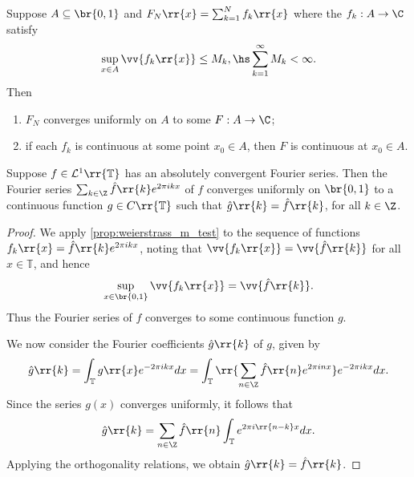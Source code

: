 \documentclass{article}
\begin{document}
\begin{proposition}\label{prop:weierstrass_m_test}
  Suppose $A\subseteq\br{0,1}$ and $F_N\rr{x}=\sum_{k=1}^{ N } f_k\rr{x}$
  where the $f_k:A\to\C$ satisfy
  \begin{align*}
    \sup_{x\in A}\vv{f_k\rr{x}} \leq M_k,\hs \sum_{k=1}^{ \infty } M_k < \infty.
  \end{align*}
  Then
  \begin{enumerate}
    \item $F_N$ converges uniformly on $A$ to some $F:A\to\C$;
    \item if each $f_k$ is continuous at some point $x_0\in A$,
      then $F$ is continuous at $x_0\in A$.
  \end{enumerate}
\end{proposition}

\begin{theorem}
  Suppose $f\in\mathcal L^1\rr{\mathbb T}$ has an absolutely convergent Fourier series. Then the
  Fourier series $\sum_{k\in\Z} \hat f\rr{k}e^{2\pi i k x}$ of $f$ converges uniformly on
  $\br{0,1}$ to a continuous function $g\in C\rr{\mathbb T}$ such that $\hat g\rr{k}=\hat f\rr{k}$,
  for all $k\in\Z$.
  \begin{proof}
    We apply \ref{prop:weierstrass_m_test} to the sequence of functions
    $f_k\rr{x}=\hat f\rr{k}e^{2\pi ikx}$, noting that $\vv{f_k\rr{x}}=\vv{\hat f\rr{k}}$
    for all $x\in\mathbb T$, and hence
    \begin{align*}
      \sup_{x\in\br{0,1}}\vv{f_k\rr{x}}=\vv{\hat f\rr{k}}.
    \end{align*}
    Thus the Fourier series of $f$ converges to some continuous function $g$.

    We now consider the Fourier coefficients $\hat g\rr{k}$ of $g$, given by
    \begin{align*}
      \hat g\rr{k}=\int_{\mathbb T} g\rr{x}e^{-2\pi ikx} dx
      = \int_{\mathbb T} \rr{\sum_{n\in\Z} \hat f\rr{n}e^{2\pi inx}}e^{-2\pi ikx}dx.
    \end{align*}
    Since the series $g(x)$ converges uniformly, it follows that
    \begin{align*}
      \hat g\rr{k}=\sum_{n\in\Z}\hat f\rr{n}\int_{\mathbb T}e^{2\pi i\rr{n-k}x}dx.
    \end{align*}
    Applying the orthogonality relations, we obtain $\hat g\rr{k}=\hat f\rr{k}$.
  \end{proof}
\end{theorem}
\end{document}
